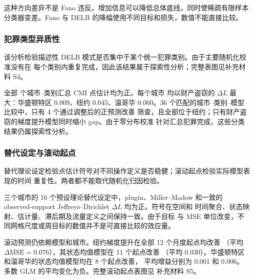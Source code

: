 这种方向差异不是 Fano 违反。增加信息可以降低总体底线，同时使稀疏有限样本
分类器变差。Fano 与 DELB 的降幅使用不同目标和损失，数值不能直接比较。

\subsubsection{犯罪类型异质性}
\label{subsec:results_crime_types}

该分析检验描述性 DELB 模式是否集中于某个统一犯罪类别。由于主要随机化校准没有在
每个类别内重复完成，因此该结果属于探索性分析；完整表图见补充材料 S4。

全部 \PositiveCrimeTypeTheory{} 个城市--类别汇总 CMI 点估计均为正。每个城市
均以财产盗窃的 \(\Delta L\) 最大：华盛顿特区 0.009、纽约 0.045、温哥华
0.060。36 个匹配的城市--类别--模型比较中，只有 4 个通过调整后的正预测改善
筛查，且全部位于纽约；只有财产盗窃的梯度提升模型同时缩小 gap。由于零分布校准
针对汇总犯罪完成，这些分类结果仍属探索性分析。

\subsubsection{替代设定与滚动起点}
\label{subsec:results_robustness}

替代理论设定检验点估计符号对不同操作定义是否稳健；滚动起点检验实际模型表现的时间
重复性。两者都不能取代随机化归因检验。

三个城市的 16 个预设理论替代设定中，plugin、Miller--Madow 和一致的
observed-support Jeffreys--Dirichlet \(\Delta L\) 均为正。符号在空间和
时间聚合、状态映射、估计量、滞后期及流量定义之间保持一致。由于目标
与 MSE 单位改变，不同网格尺度或周目标的数值并不是可直接比较的效应量。

滚动预测仍依赖模型和城市。纽约梯度提升在全部 12 个月度起点均改善
（平均 \(\Delta\mathrm{MSE}=0.076\)），其状态均值模型在 11 个起点改善
（平均 0.030）。华盛顿特区和温哥华的状态均值模型均在 8 个起点改善，
平均增益分别为 0.001 和 0.006。多数 GLM 的平均变化为负。完整滚动起点表图见
补充材料 S5。
